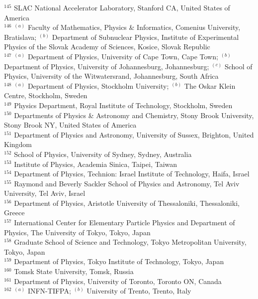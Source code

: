 \begin{flushleft}
$^{145}$ SLAC National Accelerator Laboratory, Stanford CA, United States of America\\
$^{146}$ $^{(a)}$ Faculty of Mathematics, Physics {\&} Informatics, Comenius University, Bratislava; $^{(b)}$ Department of Subnuclear Physics, Institute of Experimental Physics of the Slovak Academy of Sciences, Kosice, Slovak Republic\\
$^{147}$ $^{(a)}$ Department of Physics, University of Cape Town, Cape Town; $^{(b)}$ Department of Physics, University of Johannesburg, Johannesburg; $^{(c)}$ School of Physics, University of the Witwatersrand, Johannesburg, South Africa\\
$^{148}$ $^{(a)}$ Department of Physics, Stockholm University; $^{(b)}$ The Oskar Klein Centre, Stockholm, Sweden\\
$^{149}$ Physics Department, Royal Institute of Technology, Stockholm, Sweden\\
$^{150}$ Departments of Physics {\&} Astronomy and Chemistry, Stony Brook University, Stony Brook NY, United States of America\\
$^{151}$ Department of Physics and Astronomy, University of Sussex, Brighton, United Kingdom\\
$^{152}$ School of Physics, University of Sydney, Sydney, Australia\\
$^{153}$ Institute of Physics, Academia Sinica, Taipei, Taiwan\\
$^{154}$ Department of Physics, Technion: Israel Institute of Technology, Haifa, Israel\\
$^{155}$ Raymond and Beverly Sackler School of Physics and Astronomy, Tel Aviv University, Tel Aviv, Israel\\
$^{156}$ Department of Physics, Aristotle University of Thessaloniki, Thessaloniki, Greece\\
$^{157}$ International Center for Elementary Particle Physics and Department of Physics, The University of Tokyo, Tokyo, Japan\\
$^{158}$ Graduate School of Science and Technology, Tokyo Metropolitan University, Tokyo, Japan\\
$^{159}$ Department of Physics, Tokyo Institute of Technology, Tokyo, Japan\\
$^{160}$ Tomsk State University, Tomsk, Russia\\
$^{161}$ Department of Physics, University of Toronto, Toronto ON, Canada\\
$^{162}$ $^{(a)}$ INFN-TIFPA; $^{(b)}$ University of Trento, Trento, Italy\\

\end{flushleft}
